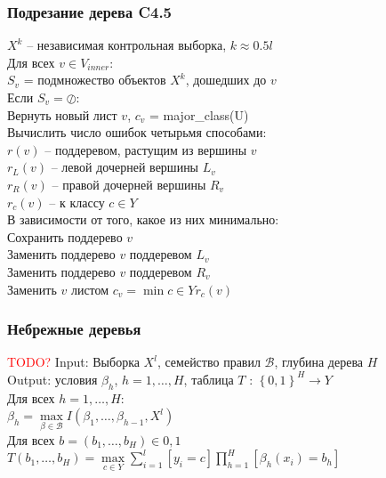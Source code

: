 \documentclass[12pt]{beamer}
\begin{document}
\begin{frame}\frametitle{Подрезание дерева C4.5}
$X^k$ -- независимая контрольная выборка, $k \approx 0.5l$\\
Для всех $v \in V_{inner}$:\\
\hspace{10mm} $S_v$ = подмножество объектов $X^k$, дошедших до $v$\\
\hspace{10mm} Если $S_v = \oslash$:\\
\hspace{20mm} Вернуть новый лист $v$, $c_v$ = major\_class(U)\\
\hspace{10mm} Вычислить число ошибок четырьмя способами:\\
\hspace{20mm} $r(v)$ -- поддеревом, растущим из вершины $v$\\
\hspace{20mm} $r_L(v)$ -- левой дочерней вершины $L_v$\\
\hspace{20mm} $r_R(v)$ -- правой дочерней вершины $R_v$\\
\hspace{20mm} $r_c(v)$ -- к классу $c \in Y$\\
\hspace{10mm} В зависимости от того, какое из них минимально:\\
\hspace{20mm} Сохранить поддерево $v$\\
\hspace{20mm} Заменить поддерево $v$ поддеревом $L_v$\\
\hspace{20mm} Заменить поддерево $v$ поддеревом $R_v$\\
\hspace{20mm} Заменить $v$ листом $c_v = \min\limits{c \in Y} r_c(v)$\\
\end{frame}

\begin{frame}\frametitle{Небрежные деревья}
\textcolor{red}{TODO?}
Input: Выборка $X^l$, семейство правил $\mathcal{B}$, глубина дерева $H$\\
Output: условия $\beta_h$, $h = 1, \dots, H$, таблица $T$ : $\left\{0, 1\right\}^H \rightarrow Y$\\
Для всех $h = 1, \dots, H$:\\
\hspace{10mm} $\beta_h = \max\limits_{\beta \in \mathcal{B}} I(\beta_1, \dots, \beta_{h-1}, X^l)$\\
Для всех $b = (b_1, \dots, b_H ) \in {0, 1}$\\
\hspace{10mm} $T(b_1,\dots, b_H ) = \max\limits_{c \in Y} \sum\limits_{i=1}^l \left[y_i = c\right] \prod\limits_{h=1}^H \left[ \beta_h(x_i) = b_h \right]$

\end{frame}
\end{document}
